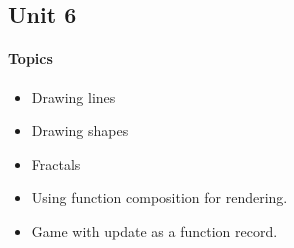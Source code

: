 \subsection*{Unit 6}
\paragraph*{Topics}
\begin{itemize}[noitemsep]
  \item Drawing lines
  \item Drawing shapes
  \item Fractals
  \item Using function composition for rendering.
  \item Game with update as a function record.
\end{itemize}
